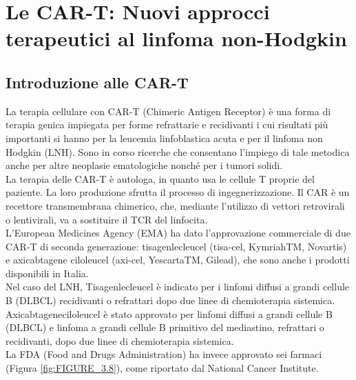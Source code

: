 \chapter{Le CAR-T: Nuovi approcci terapeutici al linfoma non-Hodgkin}

\section{Introduzione alle CAR-T}

La terapia cellulare con CAR-T (Chimeric Antigen Receptor) è una forma di terapia genica impiegata per forme 
refrattarie e recidivanti  i cui risultati più importanti si hanno per la leucemia linfoblastica acuta e per il 
linfoma non Hodgkin (LNH). Sono in corso ricerche che consentano l’impiego di tale metodica anche per altre neoplasie 
ematologiche nonché per i tumori solidi.\\
La terapia delle CAR-T è autologa, in quanto usa le cellule T proprie del paziente. La loro produzione sfrutta 
il processo di ingegnerizzazione. Il CAR è un recettore transmembrana chimerico, che, mediante l’utilizzo di 
vettori retrovirali o lentivirali, va a sostituire il TCR del linfocita.\\
L’European Medicines Agency (EMA) ha dato l’approvazione commerciale di due CAR-T di seconda generazione: 
tisagenlecleucel (tisa-cel, KymriahTM, Novartis) e axicabtagene ciloleucel (axi-cel, YescartaTM, Gilead), 
che sono anche i prodotti disponibili in Italia\cite{reteveneta}.\\
Nel caso del LNH, Tisagenlecleucel è indicato per i linfomi diffusi a grandi cellule B (DLBCL) recidivanti o 
refrattari dopo due linee di chemioterapia sistemica.\\ Axicabtageneciloleucel è stato approvato per linfomi 
diffusi a grandi cellule B (DLBCL) e linfoma a grandi cellule B primitivo del mediastino, 
refrattari o recidivanti, dopo due linee di chemioterapia sistemica\cite{EMATOCART}.\\
La FDA (Food and Drugs Administration) ha invece approvato sei farmaci (Figura \ref{fig:FIGURE_3.8}), come 
riportato dal National Cancer Institute\cite{NIHCART}.\\

